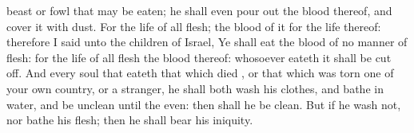 {beast or
fowl that may be
eaten; he shall even
pour out the
blood thereof, and
cover it with
dust.
For
{} the
life of all
flesh; the
blood of it
{} for the
life thereof: therefore I
said unto the
children of
Israel, Ye shall
eat the
blood of no manner of
flesh: for the
life of all
flesh
{} the
blood thereof: whosoever
eateth it shall be cut
off.
And every
soul that
eateth that which
died
{}, or that which was
torn
{} one of your own
country, or a
stranger, he shall both
wash his
clothes, and
bathe
{} in
water, and be
unclean until the
even: then shall he be
clean.
But if he
wash
{} not, nor
bathe his
flesh; then he shall
bear his
iniquity.

}
